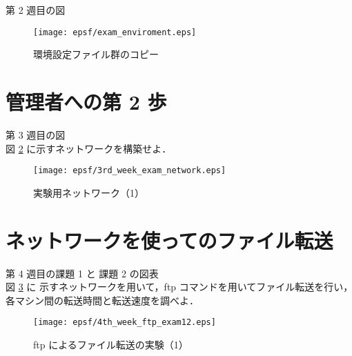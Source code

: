 \documentclass[a4j]{jreport}
\begin{document}
第 2 週目の図

\begin{figure}[H]
  \centering
  \texttt{[image: epsf/exam\_enviroment.eps]}
  \vspace*{-0.3cm}
  \caption{環境設定ファイル群のコピー}
  \label{Figure: 環境設定ファイル群のコピー}
\end{figure}


\newpage				%
\section{管理者への第 2 歩}

第 3 週目の図\\

図 \ref{Figure: 実験用ネットワーク（1）} に示すネットワークを構築せよ．

\begin{figure}[H]
  \centering
  \texttt{[image: epsf/3rd\_week\_exam\_network.eps]}
  \vspace*{-0.3cm}
  \caption{実験用ネットワーク（1）}
  \label{Figure: 実験用ネットワーク（1）}
\end{figure}


\newpage	%
\section{ネットワークを使ってのファイル転送}

第 4 週目の課題 1 と 課題 2 の図表\\

図 \ref{Figure: ftp によるファイル転送の実験（1）} に
示すネットワークを用いて，ftp コマンドを用いてファイル転送を行い，
各マシン間の転送時間と転送速度を調べよ．

\begin{figure}[H]
  \centering
  \texttt{[image: epsf/4th\_week\_ftp\_exam12.eps]}
  \vspace*{-0.3cm}
  \caption{ftp によるファイル転送の実験（1）}
  \label{Figure: ftp によるファイル転送の実験（1）}
\end{figure}
\end{document}
